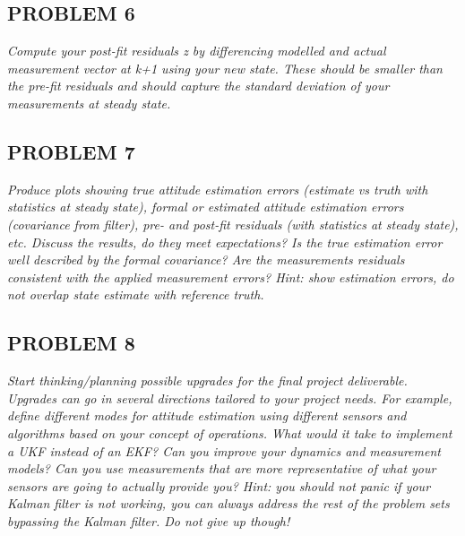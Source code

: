 \subsection{PROBLEM 6}
\textit{Compute your post-fit residuals \textit{z} by differencing modelled and actual measurement vector at k+1 using your new state. These should be smaller than the pre-fit residuals and should capture the standard deviation of your measurements at steady state.}

\subsection{PROBLEM 7}
\textit{Produce plots showing true attitude estimation errors (estimate vs truth with statistics at steady state), formal or estimated attitude estimation errors (covariance from filter), pre- and post-fit residuals (with statistics at steady state), etc. Discuss the results, do they meet expectations? Is the true estimation error well described by the formal covariance? Are the measurements residuals consistent with the applied measurement errors? Hint: show estimation errors, do not overlap state estimate with reference truth.}

\subsection{PROBLEM 8}
\textit{Start thinking/planning possible upgrades for the final project deliverable. Upgrades can go in several directions tailored to your project needs. For example, define different modes for attitude estimation using different sensors and algorithms based on your concept of operations. What would it take to implement a UKF instead of an EKF? Can you improve your dynamics and measurement models? Can you use measurements that are more representative of what your sensors are going to actually provide you? Hint: you should not panic if your Kalman filter is not working, you can always address the rest of the problem sets bypassing the Kalman filter. Do not give up though!}
